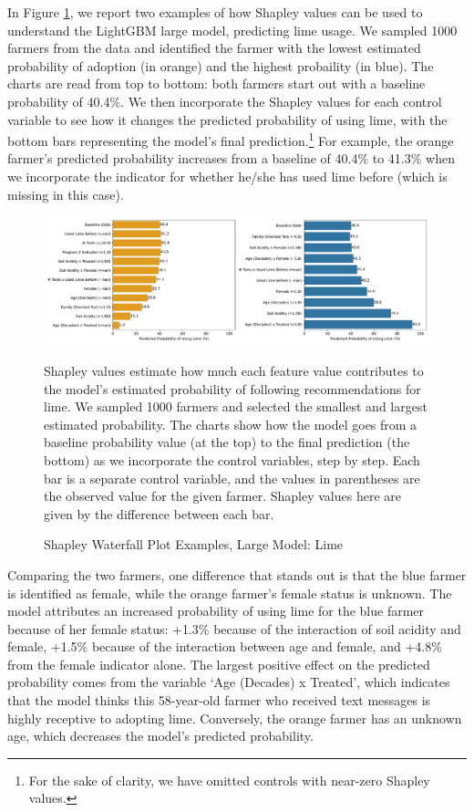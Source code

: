 \documentclass[12pt]{article}
\begin{document}
In Figure \ref{fig:shap_force}, we report two examples of how Shapley values can be used to understand the LightGBM large model, predicting lime usage. We sampled 1000 farmers from the data and identified the farmer with the lowest estimated probability of adoption (in orange) and the highest probaility (in blue). The charts are read from top to bottom: both farmers start out with a baseline probability of 40.4\%. We then incorporate the Shapley values for each control variable to see how it changes the predicted probability of using lime, with the bottom bars representing the model's final prediction.\footnote{For the sake of clarity, we have omitted controls with near-zero Shapley values.} For example, the orange farmer's predicted probability increases from a baseline of 40.4\% to 41.3\% when we incorporate the indicator for whether he/she has used lime before (which is missing in this case). 

\begin{figure}[H]
    \centering
    \caption{Shapley Waterfall Plot Examples, Large Model: Lime}
    \includegraphics[width=\textwidth]{../output/shap_forceplot_examples_lime.pdf}
    \begin{minipage}{0.8\textwidth}
    \tiny
    Shapley values estimate how much each feature value contributes to the model's estimated probability of following recommendations for lime. We sampled 1000 farmers and selected the smallest and largest estimated probability. The charts show how the model goes from a baseline probability value (at the top) to the final prediction (the bottom) as we incorporate the control variables, step by step. Each bar is a separate control variable, and the values in parentheses are the observed value for the given farmer. Shapley values here are given by the difference between each bar.
    \end{minipage}
    \label{fig:shap_force}
\end{figure}

Comparing the two farmers, one difference that stands out is that the blue farmer is identified as female, while the orange farmer's female status is unknown. The model attributes an increased probability of using lime for the blue farmer because of her female status: +1.3\% because of the interaction of soil acidity and female, +1.5\% because of the interaction between age and female, and +4.8\% from the female indicator alone. The largest positive effect on the predicted probability comes from the variable `Age (Decades) x Treated', which indicates that the model thinks this 58-year-old farmer who received text messages is highly receptive to adopting lime. Conversely, the orange farmer has an unknown age, which decreases the model's predicted probability.
\end{document}
